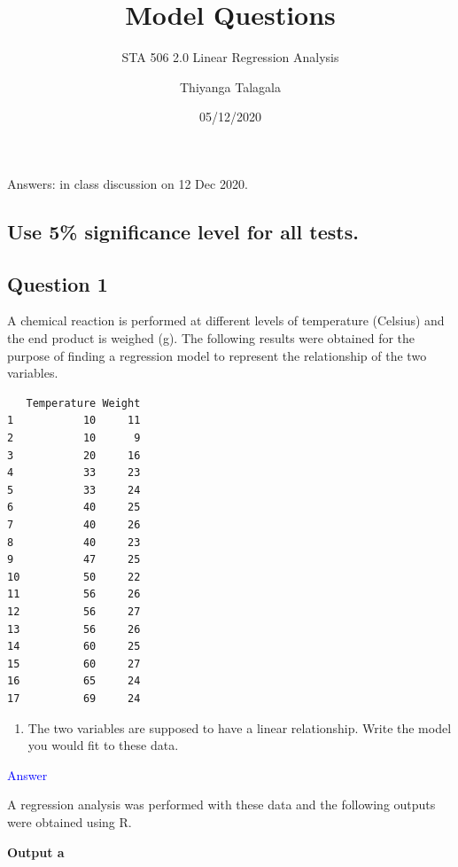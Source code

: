 \documentclass[]{article}
\title{Model Questions}
\subtitle{STA 506 2.0 Linear Regression Analysis}
\author{Thiyanga Talagala}
\date{05/12/2020}
\providecommand{\tightlist}{%
  \setlength{\itemsep}{0pt}\setlength{\parskip}{0pt}}
\begin{document}
\maketitle

Answers: in class discussion on 12 Dec 2020.

\hypertarget{use-5-significance-level-for-all-tests.}{%
\subsection{Use 5\% significance level for all
tests.}\label{use-5-significance-level-for-all-tests.}}

\hypertarget{question-1}{%
\subsection{Question 1}\label{question-1}}

A chemical reaction is performed at different levels of temperature
(Celsius) and the end product is weighed (g). The following results were
obtained for the purpose of finding a regression model to represent the
relationship of the two variables.

\begin{verbatim}
   Temperature Weight
1           10     11
2           10      9
3           20     16
4           33     23
5           33     24
6           40     25
7           40     26
8           40     23
9           47     25
10          50     22
11          56     26
12          56     27
13          56     26
14          60     25
15          60     27
16          65     24
17          69     24
\end{verbatim}

\begin{enumerate}
\def\labelenumi{\roman{enumi})}
\tightlist
\item
  The two variables are supposed to have a linear relationship. Write
  the model you would fit to these data.
\end{enumerate}

\newpage

\textcolor{blue}{Answer}

\newpage

A regression analysis was performed with these data and the following
outputs were obtained using R.

\textbf{Output a}
\end{document}
